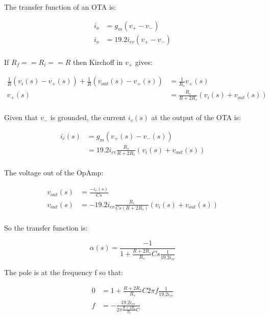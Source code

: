 \documentclass{article}
\begin{document}
The transfer function of an OTA is:

\begin{equation*}
\begin{split}
  i_o & = g_m(v_+ - v_-) \\
  i_o & = 19.2i_{cv}(v_+ - v_-) \\
\end{split}
\end{equation*}

If $R_f == R_i == R$ then Kirchoff in $v_+$ gives:

\begin{equation*}
\begin{split}
  \frac{1}{R}(v_i(s) - v_+(s)) + \frac{1}{R}(v_{out}(s) - v_+(s)) & = \frac{1}{R_s}v_+(s) \\
  v_+(s) & = \frac{R_s}{R + 2R_s}(v_i(s) + v_{out}(s)) \\
\end{split}
\end{equation*}

Given that $v_-$ is grounded, the current $i_c(s)$ at the output of the OTA is:

\begin{equation*}
\begin{split}
  i_c(s) & = g_m(v_+(s) - v_-(s)) \\
   & = 19.2i_{cv}\frac{R_s}{R + 2R_s}(v_i(s) + v_{out}(s)) \\
\end{split}
\end{equation*}

The voltage out of the OpAmp:

\begin{equation*}
\begin{split}
  v_{out}(s) & = \frac{-i_c(s)}{Cs} \\
  v_{out}(s) & = -19.2i_{cv}\frac{R_s}{Cs(R + 2R_s)}(v_i(s) + v_{out}(s)) \\
\end{split}
\end{equation*}

So the transfer function is:

\begin{equation}
  \alpha(s) = \frac{-1}{1 + \frac{R + 2 R_s}{R_s} Cs \frac{1}{19.2 i_{cv}}}
\end{equation}

The pole is at the frequency f so that:

\begin{equation*}
\begin{split}
  0 & = 1 + \frac{R + 2R_s}{R_s} C2\pi f \frac{1}{19.2 i_{cv}} \\
  f & = - \frac{19.2 i_{cv}}{2\pi\frac{R + 2 R_s}{R_s}C}\\
\end{split}
\end{equation*}
\end{document}
